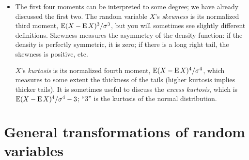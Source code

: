 \begin{itemize}
\item The first four moments can be interpreted to some degree; we
  have already discussed the first two.  The random variable $X$'s
  \emph{skewness} is its normalized third moment, $\operatorname{E}(X - \operatorname{E} X)^3 /
  \sigma^3$, but you will sometimes see slightly different definitions.
  Skewness measures the asymmetry of the density function: if the
  density is perfectly symmetric, it is zero; if there is a long right
  tail, the skewness is positive, etc.

  $X$'s \emph{kurtosis} is its normalized fourth moment, $\operatorname{E}(X - \operatorname{E}
  X)^4 / \sigma^4$, which measures to some extent the thickness of the tails
  (higher kurtosis implies thicker tails).  It is sometimes useful to
  discuss the \emph{excess kurtosis}, which is $\operatorname{E}(X - \operatorname{E} X)^4 / \sigma^4 -
  3$; ``$3$'' is the kurtosis of the normal distribution.

\end{itemize}

\section{General transformations of random variables}

